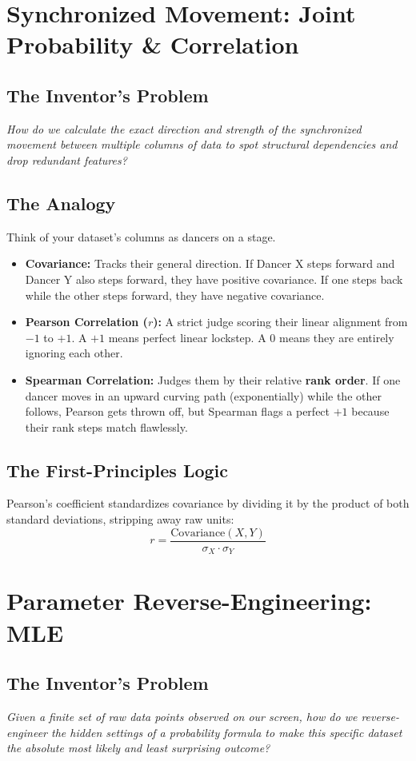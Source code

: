 \documentclass[12pt,a4paper]{article}
\begin{document}
\section{Synchronized Movement: Joint Probability \& Correlation}
\subsection*{The Inventor's Problem}
\textit{How do we calculate the exact direction and strength of the synchronized movement between multiple columns of data to spot structural dependencies and drop redundant features?}

\subsection*{The Analogy}
Think of your dataset's columns as dancers on a stage.
\begin{itemize}
    \item \textbf{Covariance:} Tracks their general direction. If Dancer X steps forward and Dancer Y also steps forward, they have positive covariance. If one steps back while the other steps forward, they have negative covariance.
    \item \textbf{Pearson Correlation ($r$):} A strict judge scoring their linear alignment from $-1$ to $+1$. A $+1$ means perfect linear lockstep. A $0$ means they are entirely ignoring each other.
    \item \textbf{Spearman Correlation:} Judges them by their relative \textbf{rank order}. If one dancer moves in an upward curving path (exponentially) while the other follows, Pearson gets thrown off, but Spearman flags a perfect $+1$ because their rank steps match flawlessly.
\end{itemize}

\subsection*{The First-Principles Logic}
Pearson's coefficient standardizes covariance by dividing it by the product of both standard deviations, stripping away raw units:
$$r = \frac{\text{Covariance}(X, Y)}{\sigma_X \cdot \sigma_Y}$$

\newpage
\section{Parameter Reverse-Engineering: MLE}
\subsection*{The Inventor's Problem}
\textit{Given a finite set of raw data points observed on our screen, how do we reverse-engineer the hidden settings of a probability formula to make this specific dataset the absolute most likely and least surprising outcome?}
\end{document}
